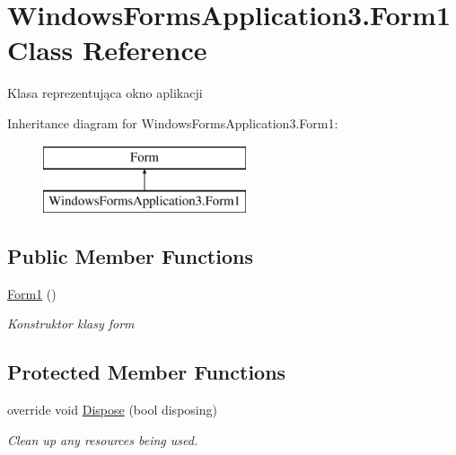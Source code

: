 \hypertarget{class_windows_forms_application3_1_1_form1}{}\section{Windows\+Forms\+Application3.\+Form1 Class Reference}
\label{class_windows_forms_application3_1_1_form1}


Klasa reprezentująca okno aplikacji  


Inheritance diagram for Windows\+Forms\+Application3.\+Form1\+:\begin{figure}[H]
\begin{center}
\leavevmode
\includegraphics[height=2.000000cm]{class_windows_forms_application3_1_1_form1}
\end{center}
\end{figure}
\subsection*{Public Member Functions}
\begin{DoxyCompactItemize}
\item 
\hyperlink{class_windows_forms_application3_1_1_form1_a48366c981585157eeb906d8309bfa035}{Form1} ()
\begin{DoxyCompactList}\small\item\em Konstruktor klasy form \end{DoxyCompactList}\end{DoxyCompactItemize}
\subsection*{Protected Member Functions}
\begin{DoxyCompactItemize}
\item 
override void \hyperlink{class_windows_forms_application3_1_1_form1_a441acc637a89bc137cd3deb11d11ae43}{Dispose} (bool disposing)
\begin{DoxyCompactList}\small\item\em Clean up any resources being used. \end{DoxyCompactList}\end{DoxyCompactItemize}


